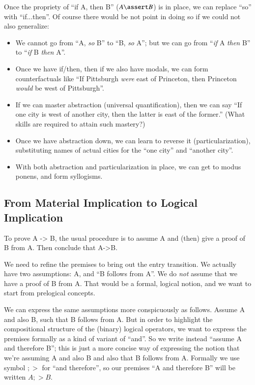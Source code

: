 Once the propriety of ``if A, then B'' (\(A\linfer B\)) is in place, we can replace ``so''
with ``if...then''. Of course there would be not point in doing so if
we could not also generalize:

\begin{itemize}
\item We cannot go from ``A, \textit{so} B'' to ``B, \textit{so} A'';
  but we can go from ``\textit{if} A \textit{then} B'' to
  ``\textit{if} B \textit{then} A''.
  \item Once we have if/then, then if we also have modals, we can form
    counterfactuals like ``If Pittsburgh \textit{were} east of
    Princeton, then Princeton \textit{would} be west of Pittsburgh''.
  \item If we can master abstraction (universal quantification), then
    we can say ``If one city is west of another city, then the latter
    is east of the former.'' (What skills are required to attain such
    mastery?)
  \item Once we have abstraction down, we can learn to reverse it
    (particularization), substituting names of actual cities for the
    ``one city'' and ``another city''.
    \item With both abstraction and particularization in place, we can
      get to modus ponens, and form syllogisms.
\end{itemize}

\subsection{From Material Implication to Logical Implication}

To prove A -> B, the usual procedure is to assume A and (then) give a
proof of B from A. Then conclude that A->B.

We need to refine the premises to bring out the entry transition. We
actually have two assumptions: A, and ``B follows from A''. We do
\textit{not} assume that we have a proof of B from A. That would be a
formal, logical notion, and we want to start from prelogical concepts.

We can express the same assumptions more conspicuously as follows.
Assume A and also B, such that B follows from A. But in order to
highlight the compositional structure of the (binary) logical
operators, we want to express the premises formally as a kind of
variant of ``and''. So we write instead ``assume A and therefore B'';
this is just a more concise way of expressing the notion that we're
assuming A and also B and also that B follows from A. Formally we use
symbol \(;>\) for ``and therefore'', so our premises ``A and therefore
B'' will be written \(A ;> B\).

